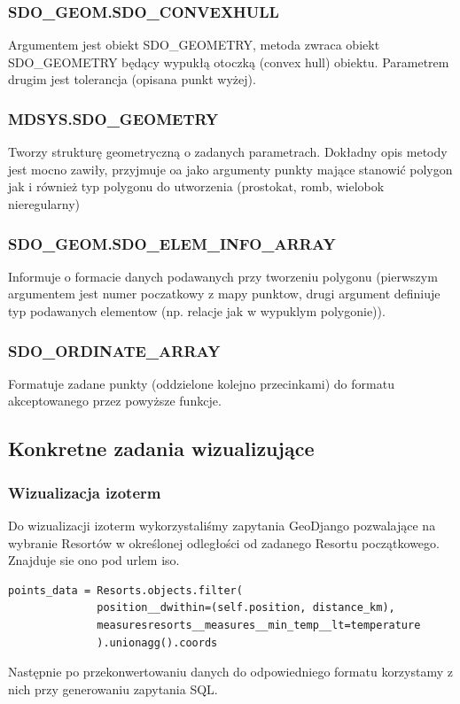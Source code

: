 \documentclass[12pt]{article}
\begin{document}
\subsubsection{SDO\_GEOM.SDO\_CONVEXHULL}
Argumentem jest obiekt SDO\_GEOMETRY, metoda zwraca obiekt SDO\_GEOMETRY będący wypukłą otoczką (convex hull) obiektu. Parametrem drugim jest tolerancja (opisana punkt wyżej).
\subsubsection{MDSYS.SDO\_GEOMETRY}
Tworzy strukturę geometryczną o zadanych parametrach. Dokładny opis metody jest mocno zawiły, przyjmuje oa jako argumenty punkty mające stanowić polygon jak i również typ polygonu do utworzenia (prostokat, romb, wielobok nieregularny)
\subsubsection{SDO\_GEOM.SDO\_ELEM\_INFO\_ARRAY}
Informuje o formacie danych podawanych przy tworzeniu polygonu (pierwszym argumentem jest numer poczatkowy z mapy punktow, drugi argument definiuje typ podawanych elementow (np. relacje jak w wypuklym polygonie)).
\subsubsection{SDO\_ORDINATE\_ARRAY}
Formatuje zadane punkty (oddzielone kolejno przecinkami) do formatu akceptowanego przez powyższe funkcje.
\subsection{Konkretne zadania wizualizujące}
\subsubsection{Wizualizacja izoterm}
Do wizualizacji izoterm wykorzystaliśmy zapytania GeoDjango pozwalające na wybranie Resortów w określonej odległości od zadanego Resortu początkowego. Znajduje sie ono pod urlem iso.

\begin{verbatim}
points_data = Resorts.objects.filter(
              position__dwithin=(self.position, distance_km),
              measuresresorts__measures__min_temp__lt=temperature
              ).unionagg().coords
\end{verbatim}

Następnie po przekonwertowaniu danych do odpowiedniego formatu korzystamy z nich przy generowaniu zapytania SQL.
\end{document}
